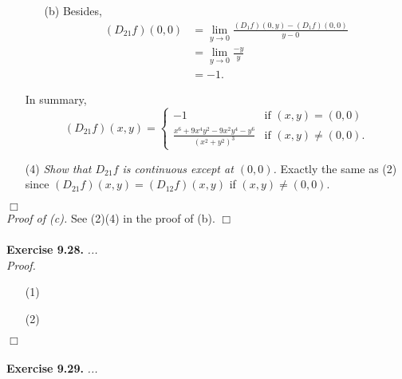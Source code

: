 \documentclass{article}
\begin{document}
\begin{enumerate}
\begin{enumerate}
  \item[(b)]
    Besides,
    \begin{align*}
      (D_{21} f)(0,0)
      &= \lim_{y \to 0} \frac{(D_1 f)(0,y) - (D_1 f)(0,0)}{y - 0} \\
      &= \lim_{y \to 0} \frac{-y}{y} \\
      &= -1.
    \end{align*}
  \end{enumerate}
  In summary,
  \begin{equation*}
    (D_{21} f)(x,y) =
    \begin{cases}
      -1
        & \text{if $(x,y) = (0,0)$} \\
      \frac{x^6+9x^4y^2-9x^2y^4-y^6}{(x^2+y^2)^3}
        & \text{if $(x,y) \neq (0,0)$}.
    \end{cases}
  \end{equation*}

\item[(4)]
  \emph{Show that $D_{21}f$ is continuous except at $(0,0)$.}
  Exactly the same as (2) since $(D_{21} f)(x,y) = (D_{12} f)(x,y)$ if $(x,y) \neq (0,0)$.

\end{enumerate}
$\Box$ \\



\emph{Proof of (c).}
  See (2)(4) in the proof of (b).
$\Box$ \\\\






\textbf{Exercise 9.28.}
\emph{...} \\

\emph{Proof.}
\begin{enumerate}
\item[(1)]
\item[(2)]

\end{enumerate}
$\Box$ \\\\






\textbf{Exercise 9.29.}
\emph{...} \\
\end{document}
